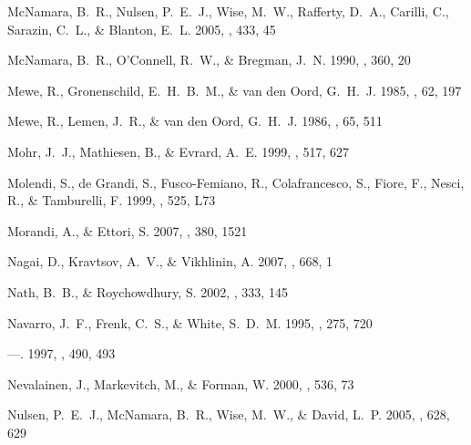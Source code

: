 \documentclass[12pt,preprint]{aastex}
\begin{document}
\begin{thebibliography}{138}
{McNamara}, B.~R., {Nulsen}, P.~E.~J., {Wise}, M.~W., {Rafferty}, D.~A.,
  {Carilli}, C., {Sarazin}, C.~L., \& {Blanton}, E.~L. 2005, \nat, 433, 45

{McNamara}, B.~R., {O'Connell}, R.~W., \& {Bregman}, J.~N. 1990, \apj, 360, 20

{Mewe}, R., {Gronenschild}, E.~H.~B.~M., \& {van den Oord}, G.~H.~J. 1985,
  \aaps, 62, 197

{Mewe}, R., {Lemen}, J.~R., \& {van den Oord}, G.~H.~J. 1986, \aaps, 65, 511

{Mohr}, J.~J., {Mathiesen}, B., \& {Evrard}, A.~E. 1999, \apj, 517, 627

{Molendi}, S., {de Grandi}, S., {Fusco-Femiano}, R., {Colafrancesco}, S.,
  {Fiore}, F., {Nesci}, R., \& {Tamburelli}, F. 1999, \apjl, 525, L73

{Morandi}, A., \& {Ettori}, S. 2007, \mnras, 380, 1521

{Nagai}, D., {Kravtsov}, A.~V., \& {Vikhlinin}, A. 2007, \apj, 668, 1

{Nath}, B.~B., \& {Roychowdhury}, S. 2002, \mnras, 333, 145

{Navarro}, J.~F., {Frenk}, C.~S., \& {White}, S.~D.~M. 1995, \mnras, 275, 720

---. 1997, \apj, 490, 493

{Nevalainen}, J., {Markevitch}, M., \& {Forman}, W. 2000, \apj, 536, 73

{Nulsen}, P.~E.~J., {McNamara}, B.~R., {Wise}, M.~W., \& {David}, L.~P. 2005,
  \apj, 628, 629


\end{thebibliography}
\end{document}
